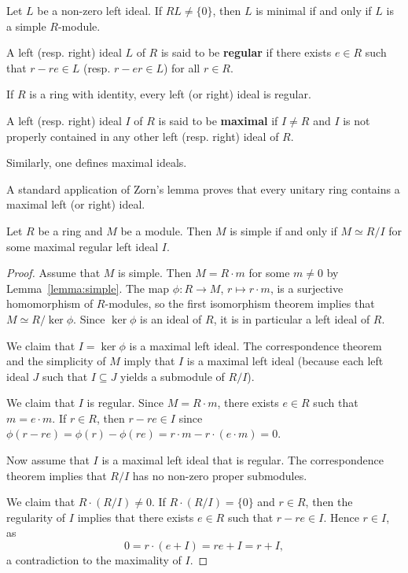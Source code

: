 \begin{example}
	Let $L$ be a non-zero left ideal. If $RL\ne\{0\}$, then
	$L$ is minimal if and only if $L$ is a simple $R$-module. 
\end{example}

\begin{definition}
\label{def:regular}
A left (resp. right) ideal $L$ of $R$ is said to be \textbf{regular} if
there exists $e\in R$ such that $r-re\in L$ (resp.  $r-er\in L$) for all $r\in R$.
\end{definition}

If $R$ is a ring with identity, every left (or right) ideal is regular. 

\begin{definition}
A left (resp. right) ideal $I$ of $R$ is said to be \textbf{maximal} if $I\ne R$ and $I$ is not properly contained 
in any other left (resp. right) ideal of $R$. 
\end{definition}

Similarly, one defines maximal ideals. 

A standard application of Zorn's lemma proves 
that every unitary ring contains a maximal left (or right) ideal.  

\begin{proposition}
	\label{proposition:R/I}
	Let $R$ be a ring and $M$ be a module. Then $M$ is simple if and only if
	$M\simeq R/I$ for some maximal regular left ideal $I$. 	
\end{proposition}

\begin{proof}
	Assume that $M$ is simple. Then $M=R\cdot m$ for some $m\ne0$ by 
	Lemma~\ref{lemma:simple}. The map $\phi\colon R\to M$, $r\mapsto r\cdot m$, 
	is a surjective homomorphism of $R$-modules, 
	so the first isomorphism theorem implies that 
	$M\simeq R/\ker\phi$. Since $\ker\phi$ is an ideal of $R$, it is 
	in particular a left ideal of $R$. 
	
	We claim that $I=\ker\phi$ is a maximal left ideal. 
	The correspondence theorem 
	and the simplicity of $M$ imply that $I$ is a 
	maximal left ideal (because each left ideal $J$ such that 
	$I\subseteq J$ yields a submodule of $R/I$).

	We claim that $I$ is regular. Since $M=R\cdot m$, there exists $e\in R$ such that $m=e\cdot m$. If
	$r\in R$, then $r-re\in I$ since 
	$\phi(r-re)=\phi(r)-\phi(re)=r\cdot m-r\cdot (e\cdot m)=0$.

    Now assume that $I$ is a maximal left ideal that is regular. 
    The correspondence theorem implies that 
    $R/I$ has no non-zero proper submodules. 
    
    We claim that 
    $R\cdot (R/I)\ne0$. If $R\cdot (R/I)=\{0\}$ and $r\in R$, then 
    the regularity of $I$ implies that 
    there exists $e\in R$ such that $r-re\in I$. Hence $r\in I$, as  
	\[
	0=r\cdot (e+I)=re+I=r+I,
	\]
	a contradiction to the maximality of $I$. 
\end{proof}



